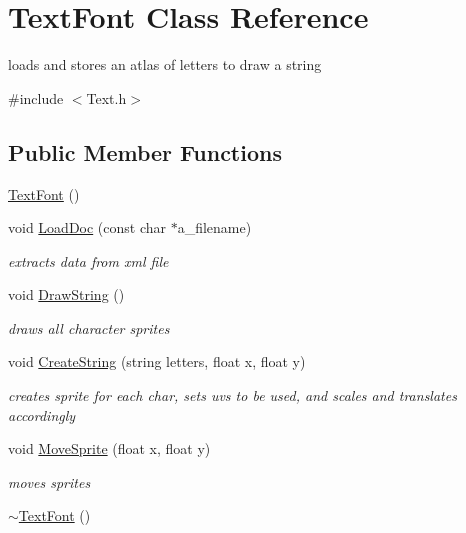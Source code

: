 \hypertarget{class_text_font}{}\section{Text\+Font Class Reference}
\label{class_text_font}


loads and stores an atlas of letters to draw a string  




{\ttfamily \#include $<$Text.\+h$>$}

\subsection*{Public Member Functions}
\begin{DoxyCompactItemize}
\item 
\hyperlink{class_text_font_acee7cc3de831d46a13bf2a1b8b2ef7f7}{Text\+Font} ()
\item 
void \hyperlink{class_text_font_aa2744efbcefdf7eeb6df43e57ba6c773}{Load\+Doc} (const char $\ast$a\+\_\+filename)
\begin{DoxyCompactList}\small\item\em extracts data from xml file \end{DoxyCompactList}\item 
void \hyperlink{class_text_font_a93ee1baed83e589ab49d68efdcabfd84}{Draw\+String} ()
\begin{DoxyCompactList}\small\item\em draws all character sprites \end{DoxyCompactList}\item 
void \hyperlink{class_text_font_a43116fad524ee016b375c58fa0b6b699}{Create\+String} (string letters, float x, float y)
\begin{DoxyCompactList}\small\item\em creates sprite for each char, sets uvs to be used, and scales and translates accordingly \end{DoxyCompactList}\item 
void \hyperlink{class_text_font_a3bdc49e8f6f05a5c7d5dd3b50abc01f5}{Move\+Sprite} (float x, float y)
\begin{DoxyCompactList}\small\item\em moves sprites \end{DoxyCompactList}\item 
\hyperlink{class_text_font_afbd66b50c68b85627168568350bdcddb}{$\sim$\+Text\+Font} ()
\end{DoxyCompactItemize}

